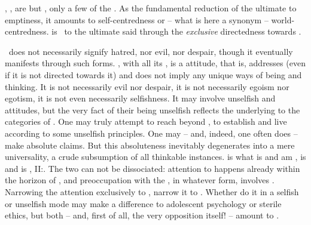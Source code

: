 \pa\label{pa:notno} , ,  are but
, only a few  of the  \No.  As the
fundamental reduction of the ultimate  to emptiness, it amounts
to {self-centredness} or -- what is here a synonym -- {world-centredness}.
 is \No\ to the ultimate  said 
through the {\em exclusive} directedness towards .
%

\No\ does not  necessarily signify hatred, nor evil, nor despair, 
though it eventually manifests through such forms.  , with all
its , is a  attitude, that is, addresses 
(even if it is not directed towards it) and does not imply any unique ways of
 being and thinking.  It is not necessarily evil nor despair, it is
not necessarily egoism nor egotism, it is not even necessarily selfishness. It
may involve unselfish  and attitudes, but the very fact of their being
unselfish reflects the underlying  to the categories of
.  One may truly attempt to reach beyond , to establish
and live according to some unselfish principles. One may -- and, indeed, one
often does -- make absolute claims. But this absoluteness inevitably degenerates
into a mere universality, a crude subsumption of all thinkable instances.
 is what is  and  am ,  is  and  is ,
II:.  The two can not be dissociated: attention to
 happens already within the horizon of , and
preoccupation with the , in whatever form, involves
.  Narrowing the attention exclusively to , 
narrow it to . Whether  do it in a selfish or unselfish mode
may make a difference to adolescent psychology or sterile ethics, but
 both -- and, first of all, the very opposition itself! --
amount to .

